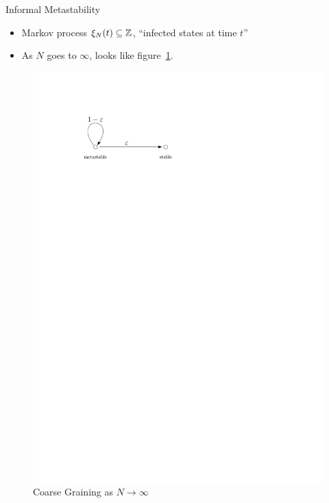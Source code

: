 \documentclass{beamer}
\begin{document}
\begin{frame}{Informal Metastability}
  \begin{itemize}
    \item Markov process $\xi_{N}(t) \subseteq \mathbb{Z}$, ``infected states at time $t$''
    \pause
    \item As $N$ goes to $\infty$, looks like figure~\ref{fig:coarse_grain}.
  \end{itemize}
  \begin{figure}
    \includegraphics[width=0.7\pagewidth]{metastable_coarse_grain.pdf}
    \caption{Coarse Graining as $N \to \infty$}
    \label{fig:coarse_grain}
  \end{figure}
\end{frame}
\end{document}
